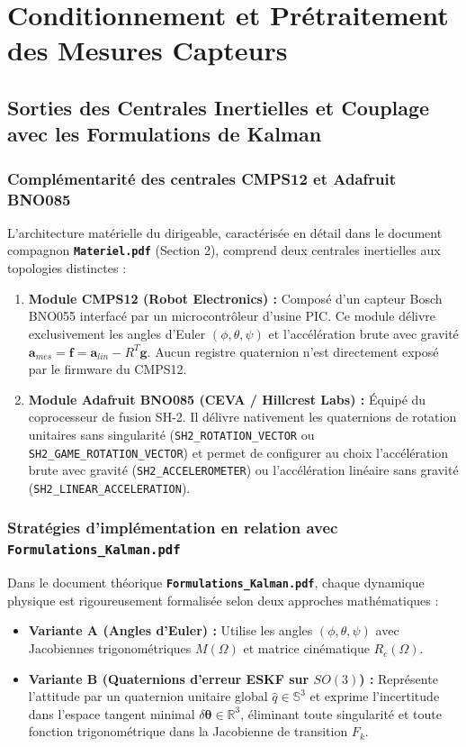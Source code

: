 \documentclass[../Implementation.tex]{subfiles}
\begin{document}
\section{Conditionnement et Prétraitement des Mesures Capteurs}

\subsection{Sorties des Centrales Inertielles et Couplage avec les Formulations de Kalman}

\subsubsection{Complémentarité des centrales CMPS12 et Adafruit BNO085}
L'architecture matérielle du dirigeable, caractérisée en détail dans le document compagnon \textbf{\texttt{Materiel.pdf}} (Section 2), comprend deux centrales inertielles aux topologies distinctes :
\begin{enumerate}
    \item \textbf{Module CMPS12 (Robot Electronics) :} 
    Composé d'un capteur Bosch BNO055 interfacé par un microcontrôleur d'usine PIC. Ce module délivre exclusivement les angles d'Euler $(\phi, \theta, \psi)$ et l'accélération brute avec gravité $\mathbf{a}_{mes} = \mathbf{f} = \mathbf{a}_{lin} - R^T \mathbf{g}$. Aucun registre quaternion n'est directement exposé par le firmware du CMPS12.
    \item \textbf{Module Adafruit BNO085 (CEVA / Hillcrest Labs) :} 
    Équipé du coprocesseur de fusion SH-2. Il délivre nativement les quaternions de rotation unitaires sans singularité (\lstinline|SH2_ROTATION_VECTOR| ou \lstinline|SH2_GAME_ROTATION_VECTOR|) et permet de configurer au choix l'accélération brute avec gravité (\lstinline|SH2_ACCELEROMETER|) ou l'accélération linéaire sans gravité (\lstinline|SH2_LINEAR_ACCELERATION|).
\end{enumerate}

\subsubsection{Stratégies d'implémentation en relation avec \texttt{Formulations\_Kalman.pdf}}
Dans le document théorique \textbf{\texttt{Formulations\_Kalman.pdf}}, chaque dynamique physique est rigoureusement formalisée selon deux approches mathématiques :
\begin{itemize}
    \item \textbf{Variante A (Angles d'Euler) :} Utilise les angles $(\phi, \theta, \psi)$ avec Jacobiennes trigonométriques $M(\Omega)$ et matrice cinématique $R_c(\Omega)$.
    \item \textbf{Variante B (Quaternions d'erreur ESKF sur $SO(3)$) :} Représente l'attitude par un quaternion unitaire global $\hat{q} \in \mathbb{S}^3$ et exprime l'incertitude dans l'espace tangent minimal $\delta\boldsymbol{\theta} \in \mathbb{R}^3$, éliminant toute singularité et toute fonction trigonométrique dans la Jacobienne de transition $F_k$.
\end{itemize}
\end{document}
